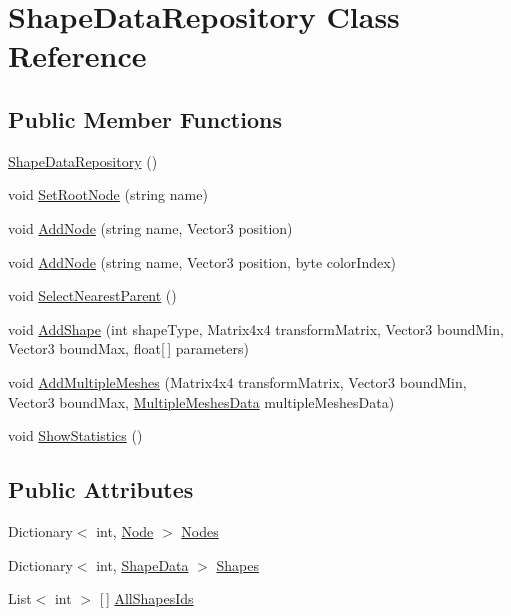 \hypertarget{class_shape_data_repository}{}\section{Shape\+Data\+Repository Class Reference}
\label{class_shape_data_repository}
\subsection*{Public Member Functions}
\begin{DoxyCompactItemize}
\item 
\mbox{\hyperlink{class_shape_data_repository_a72fa4e7e5d207d909ea6f3f37f90e96e}{Shape\+Data\+Repository}} ()
\item 
void \mbox{\hyperlink{class_shape_data_repository_afba0b4ca1fb9e8ab06adcd58d804adda}{Set\+Root\+Node}} (string name)
\item 
void \mbox{\hyperlink{class_shape_data_repository_a00ae8e4c8c8a1269d14e829a308bf71c}{Add\+Node}} (string name, Vector3 position)
\item 
void \mbox{\hyperlink{class_shape_data_repository_aec3bcbfd198c43b2f215a63f900f7738}{Add\+Node}} (string name, Vector3 position, byte color\+Index)
\item 
void \mbox{\hyperlink{class_shape_data_repository_aa451bfc416815c2c7d3c5718056f857a}{Select\+Nearest\+Parent}} ()
\item 
void \mbox{\hyperlink{class_shape_data_repository_afb3ac8b9a7e92031a07ca53b2be82bc7}{Add\+Shape}} (int shape\+Type, Matrix4x4 transform\+Matrix, Vector3 bound\+Min, Vector3 bound\+Max, float\mbox{[}$\,$\mbox{]} parameters)
\item 
void \mbox{\hyperlink{class_shape_data_repository_a73333f81396a254f00a9732c9512cb05}{Add\+Multiple\+Meshes}} (Matrix4x4 transform\+Matrix, Vector3 bound\+Min, Vector3 bound\+Max, \mbox{\hyperlink{class_multiple_meshes_data}{Multiple\+Meshes\+Data}} multiple\+Meshes\+Data)
\item 
void \mbox{\hyperlink{class_shape_data_repository_a2c313da2ff206137f70a1999a8970e5f}{Show\+Statistics}} ()
\end{DoxyCompactItemize}
\subsection*{Public Attributes}
\begin{DoxyCompactItemize}
\item 
Dictionary$<$ int, \mbox{\hyperlink{class_node}{Node}} $>$ \mbox{\hyperlink{class_shape_data_repository_a619c97595fd858080d11d3c827cda855}{Nodes}}
\item 
Dictionary$<$ int, \mbox{\hyperlink{class_shape_data}{Shape\+Data}} $>$ \mbox{\hyperlink{class_shape_data_repository_a3db12e581c70b38a9f2631ea345e2a68}{Shapes}}
\item 
List$<$ int $>$ \mbox{[}$\,$\mbox{]} \mbox{\hyperlink{class_shape_data_repository_a8c56775a61e62f370fae03d64a5ba991}{All\+Shapes\+Ids}}
\end{DoxyCompactItemize}


